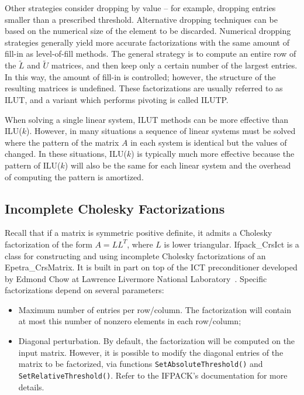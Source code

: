 Other strategies consider dropping by value -- for example, dropping
entries smaller than a prescribed threshold. Alternative dropping
techniques can be based on the numerical size of the element to be
discarded. Numerical dropping strategies generally yield more accurate
factorizations with the same amount of fill-in as level-of-fill
methods. The general strategy is to compute an entire row of the
$\tilde{L}$ and $\tilde{U}$ matrices, and then keep only a certain
number of the largest
entries. In this way, the amount of fill-in is
controlled; however, the structure of the resulting matrices is
undefined. These factorizations are usually referred to as ILUT, and a
variant which performs pivoting is called ILUTP.  

When solving a single linear system, ILUT methods can be more effective
than ILU($k$).  However, in many situations a sequence of linear systems
must be solved where the pattern of the matrix $A$ in each system is
identical but the values of changed.  In these situations, ILU($k$) is 
typically much more effective because the pattern of ILU($k$) will also
be the same for each linear system and the overhead of computing the
pattern is amortized.

\subsection{Incomplete Cholesky Factorizations}
\label{sec:ifpack_chol}

Recall that if a matrix is symmetric positive definite, it admits a Cholesky
factorization of the form $A=LL^T$, where $L$ is lower triangular.
Ifpack\_CrsIct is a class for constructing and using incomplete Cholesky
factorizations of an Epetra\_CrsMatrix. It is built in part on top of the ICT
preconditioner developed by Edmond Chow at Lawrence Livermore National
Laboratory~\cite{ChowICT}.  Specific factorizations depend on several parameters:
\begin{itemize}
\item Maximum number of entries per row/column. The factorization
  will contain at most this number of nonzero elements in each
  row/column;
\item Diagonal perturbation.  By default, the factorization will be
  computed on the input matrix. However, it is possible to modify the
  diagonal entries of the matrix to be factorized, via functions
  \verb!SetAbsoluteThreshold()! and \verb!SetRelativeThreshold()!. Refer
  to the IFPACK's documentation for more details.
\end{itemize}

